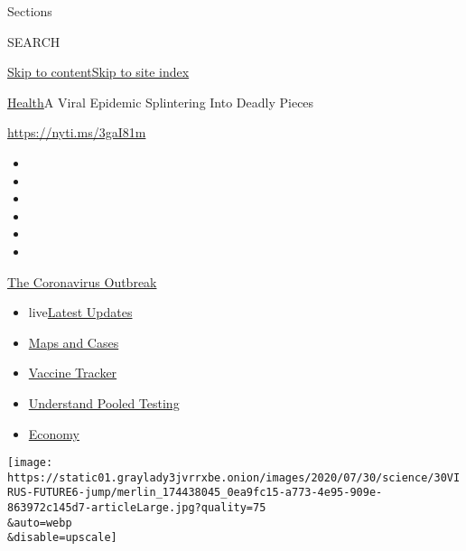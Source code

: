 Sections

SEARCH

\protect\hyperlink{site-content}{Skip to
content}\protect\hyperlink{site-index}{Skip to site index}

\href{/section/health}{Health}\textbar{}A Viral Epidemic Splintering
Into Deadly Pieces

\url{https://nyti.ms/3gaI81m}

\begin{itemize}
\item
\item
\item
\item
\item
\item
\end{itemize}

\href{https://www.nytimes3xbfgragh.onion/news-event/coronavirus?action=click\&pgtype=Article\&state=default\&region=TOP_BANNER\&context=storylines_menu}{The
Coronavirus Outbreak}

\begin{itemize}
\tightlist
\item
  live\href{https://www.nytimes3xbfgragh.onion/2020/07/29/world/coronavirus-covid-19.html?action=click\&pgtype=Article\&state=default\&region=TOP_BANNER\&context=storylines_menu}{Latest
  Updates}
\item
  \href{https://www.nytimes3xbfgragh.onion/interactive/2020/us/coronavirus-us-cases.html?action=click\&pgtype=Article\&state=default\&region=TOP_BANNER\&context=storylines_menu}{Maps
  and Cases}
\item
  \href{https://www.nytimes3xbfgragh.onion/interactive/2020/science/coronavirus-vaccine-tracker.html?action=click\&pgtype=Article\&state=default\&region=TOP_BANNER\&context=storylines_menu}{Vaccine
  Tracker}
\item
  \href{https://www.nytimes3xbfgragh.onion/interactive/2020/07/27/upshot/coronavirus-pooled-testing.html?action=click\&pgtype=Article\&state=default\&region=TOP_BANNER\&context=storylines_menu}{Understand
  Pooled Testing}
\item
  \href{https://www.nytimes3xbfgragh.onion/live/2020/07/29/business/stock-market-today-coronavirus?action=click\&pgtype=Article\&state=default\&region=TOP_BANNER\&context=storylines_menu}{Economy}
\end{itemize}

\texttt{[image: https://static01.graylady3jvrrxbe.onion/images/2020/07/30/science/30VIRUS-FUTURE6-jump/merlin\_174438045\_0ea9fc15-a773-4e95-909e-863972c145d7-articleLarge.jpg?quality=75\\\&auto=webp\\\&disable=upscale]}

